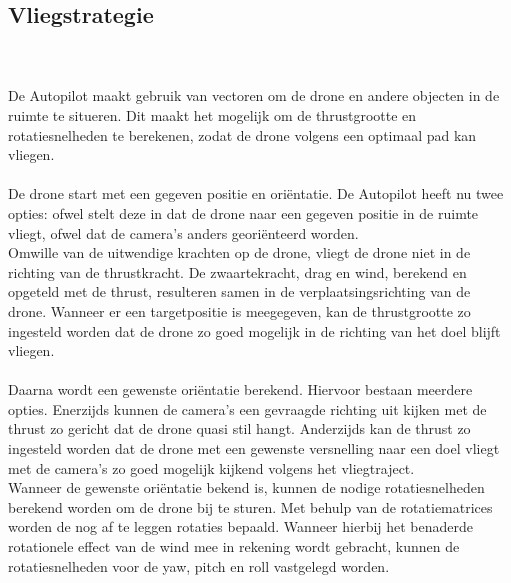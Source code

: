 \subsection{Vliegstrategie}
\\
\\
De Autopilot maakt gebruik van vectoren om de drone en andere objecten in de ruimte te situeren. Dit maakt het mogelijk om de thrustgrootte en rotatiesnelheden te berekenen, zodat de drone volgens een optimaal pad kan vliegen.
\\
\\
De drone start met een gegeven positie en ori\"entatie. De Autopilot heeft nu twee opties: ofwel stelt deze in dat de drone naar een gegeven positie in de ruimte vliegt, ofwel dat de camera's anders geori\"enteerd worden.
\\
Omwille van de uitwendige krachten op de drone, vliegt de drone niet in de richting van de thrustkracht. De zwaartekracht, drag en wind, berekend en opgeteld met de thrust, resulteren samen in de verplaatsingsrichting van de drone. Wanneer er een targetpositie is meegegeven, kan de thrustgrootte zo ingesteld worden dat de drone zo goed mogelijk in de richting van het doel blijft vliegen.
\\
\\
Daarna wordt een gewenste ori\"entatie berekend. Hiervoor bestaan meerdere opties. Enerzijds kunnen de camera's een gevraagde richting uit kijken met de thrust zo gericht dat de drone quasi stil hangt. Anderzijds kan de thrust zo ingesteld worden dat de drone met een gewenste versnelling naar een doel vliegt met de camera's zo goed mogelijk kijkend volgens het vliegtraject.
\\
Wanneer de gewenste ori\"entatie bekend is, kunnen de nodige rotatiesnelheden berekend worden om de drone bij te sturen. Met behulp van de rotatiematrices worden de nog af te leggen rotaties bepaald. Wanneer hierbij het benaderde rotationele effect van de wind mee in rekening wordt gebracht, kunnen de rotatiesnelheden voor de yaw, pitch en roll vastgelegd worden.